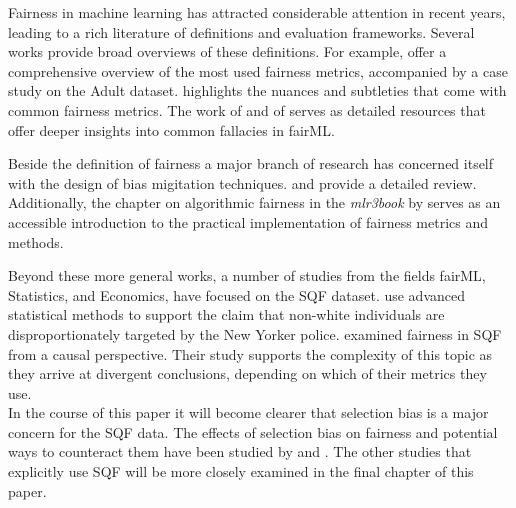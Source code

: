 Fairness in machine learning has attracted considerable attention in recent years, leading to a rich literature of definitions and evaluation frameworks. Several works provide broad overviews of these definitions. For example, \cite{verma2018} offer a comprehensive overview of the most used fairness metrics, accompanied by a case study on the Adult dataset. \cite{castelnovo2022} highlights the nuances and subtleties that come with common fairness metrics. The work of \cite{corbett-davies} and of \cite{barocas} serves as detailed resources that offer deeper insights into common fallacies in fairML.

Beside the definition of fairness a major branch of research has concerned itself with the design of bias migitation techniques. \cite{mehrabi2022} and \cite{caton2024} provide a detailed review. Additionally, the chapter on algorithmic fairness in the \textsl{mlr3book} by \cite{mlr3_book} serves as an accessible introduction to the practical implementation of fairness metrics and methods.\par

Beyond these more general works, a number of studies from the fields fairML, Statistics, and Economics, have focused on the SQF dataset. \cite{goel2016} use advanced statistical methods to support the claim that non-white individuals are disproportionately targeted by the New Yorker police.
\cite{Khademi2019FADMELC} examined fairness in SQF from a causal perspective. Their study supports the complexity of this topic as they arrive at divergent conclusions, depending on which of their metrics they use.\\
In the course of this paper it will become clearer that selection bias is a major concern for the SQF data. The effects of selection bias on fairness and potential ways to counteract them have been studied by \cite{Lakkaraju2017SLPEAPPU} and \cite{favier2023}.
The other studies that explicitly use SQF \cite{Badr2022DTFANSP, rambachan2016, kallus2018} will be more closely examined in the final chapter of this paper.

